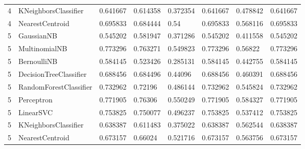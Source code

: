 \documentclass{article}
\begin{document}
\begin{table}[h]
\begin{tabular}{llllllll}
4             & KNeighborsClassifier   & 0.641667          & 0.614358          & 0.372354              & 0.641667              & 0.478842                 & 0.641667                 \\
4             & NearestCentroid        & 0.695833          & 0.684444          & 0.54                  & 0.695833              & 0.568116                 & 0.695833                 \\
5             & GaussianNB             & 0.545202          & 0.581947          & 0.371286              & 0.545202              & 0.411558                 & 0.545202                 \\
5             & MultinomialNB          & 0.773296          & 0.763271          & 0.549823              & 0.773296              & 0.56822                  & 0.773296                 \\
5             & BernoulliNB            & 0.584145          & 0.523426          & 0.285131              & 0.584145              & 0.442755                 & 0.584145                 \\
5             & DecisionTreeClassifier & 0.688456          & 0.684496          & 0.44096               & 0.688456              & 0.460391                 & 0.688456                 \\
5             & RandomForestClassifier & 0.732962          & 0.72196           & 0.486144              & 0.732962              & 0.545824                 & 0.732962                 \\
5             & Perceptron             & 0.771905          & 0.76306           & 0.550249              & 0.771905              & 0.584327                 & 0.771905                 \\
5             & LinearSVC              & 0.753825          & 0.750077          & 0.496237              & 0.753825              & 0.537412                 & 0.753825                 \\
5             & KNeighborsClassifier   & 0.638387          & 0.611483          & 0.375022              & 0.638387              & 0.562544                 & 0.638387                 \\
5             & NearestCentroid        & 0.673157          & 0.66024           & 0.521716              & 0.673157              & 0.563756                 & 0.673157
\end{tabular}
\end{table}
\end{document}

